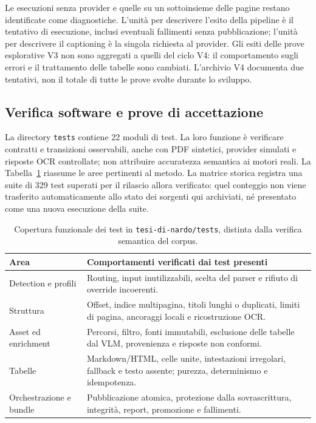 Le esecuzioni senza provider e quelle su un sottoinsieme delle pagine restano identificate come diagnostiche. L'unità per descrivere l'esito della pipeline è il tentativo di esecuzione, inclusi eventuali fallimenti senza pubblicazione; l'unità per descrivere il captioning è la singola richiesta al provider. Gli esiti delle prove esplorative V3 non sono aggregati a quelli del ciclo V4: il comportamento sugli errori e il trattamento delle tabelle sono cambiati. L'archivio V4 documenta due tentativi, non il totale di tutte le prove svolte durante lo sviluppo.

\subsection{Verifica software e prove di accettazione}

La directory \texttt{tests} contiene 22 moduli di test. La loro funzione è verificare contratti e transizioni osservabili, anche con PDF sintetici, provider simulati e risposte OCR controllate; non attribuire accuratezza semantica ai motori reali. La Tabella~\ref{tab:test-metodi} riassume le aree pertinenti al metodo. La matrice storica registra una suite di 329 test superati per il rilascio allora verificato: quel conteggio non viene trasferito automaticamente allo stato dei sorgenti qui archiviati, né presentato come una nuova esecuzione della suite.

\begin{table}[!htbp]
\centering
\caption{Copertura funzionale dei test in \texttt{tesi-di-nardo/tests}, distinta dalla verifica semantica del corpus.}
\label{tab:test-metodi}
\small
\begin{tabularx}{\textwidth}{@{}>{\raggedright\arraybackslash}p{}X@{}}
\toprule
Area & Comportamenti verificati dai test presenti \\
\midrule
Detection e profili & Routing, input inutilizzabili, scelta del parser e rifiuto di override incoerenti. \tabularnewline
Struttura & Offset, indice multipagina, titoli lunghi o duplicati, limiti di pagina, ancoraggi locali e ricostruzione OCR. \tabularnewline
Asset ed enrichment & Percorsi, filtro, fonti immutabili, esclusione delle tabelle dal VLM, provenienza e risposte non conformi. \tabularnewline
Tabelle & Markdown/HTML, celle unite, intestazioni irregolari, fallback e testo assente; purezza, determinismo e idempotenza. \tabularnewline
Orchestrazione e bundle & Pubblicazione atomica, protezione dalla sovrascrittura, integrità, report, promozione e fallimenti. \tabularnewline
\bottomrule
\end{tabularx}
\end{table}

